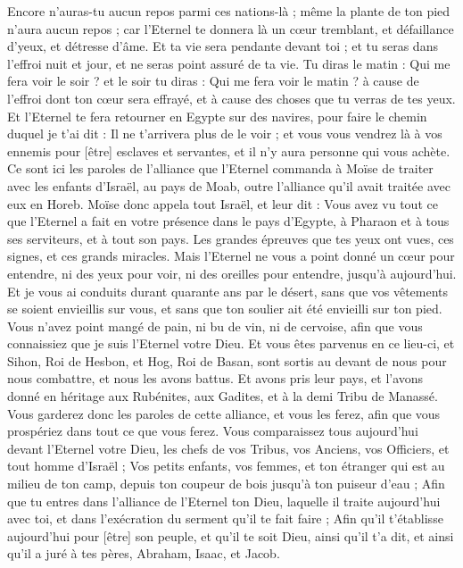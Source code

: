 \begin{multicols}{2}
Encore n'auras-tu aucun repos parmi ces nations-là ; même la plante de ton pied n'aura aucun repos ; car l'Eternel te donnera là un cœur tremblant, et défaillance d'yeux, et détresse d'âme.
Et ta vie sera pendante devant toi ; et tu seras dans l'effroi nuit et jour, et ne seras point assuré de ta vie.
Tu diras le matin : Qui me fera voir le soir ? et le soir tu diras : Qui me fera voir le matin ? à cause de l'effroi dont ton cœur sera effrayé, et à cause des choses que tu verras de tes yeux.
Et l'Eternel te fera retourner en Egypte sur des navires, pour faire le chemin duquel je t'ai dit : Il ne t'arrivera plus de le voir ; et vous vous vendrez là à vos ennemis pour [être] esclaves et servantes, et il n'y aura personne qui vous achète.
\VerseOne{}Ce sont ici les paroles de l'alliance que l'Eternel commanda à Moïse de traiter avec les enfants d'Israël, au pays de Moab, outre l'alliance qu'il avait traitée avec eux en Horeb.
Moïse donc appela tout Israël, et leur dit : Vous avez vu tout ce que l'Eternel a fait en votre présence dans le pays d'Egypte, à Pharaon et à tous ses serviteurs, et à tout son pays.
Les grandes épreuves que tes yeux ont vues, ces signes, et ces grands miracles.
Mais l'Eternel ne vous a point donné un cœur pour entendre, ni des yeux pour voir, ni des oreilles pour entendre, jusqu'à aujourd'hui.
Et je vous ai conduits durant quarante ans par le désert, sans que vos vêtements se soient envieillis sur vous, et sans que ton soulier ait été envieilli sur ton pied.
Vous n'avez point mangé de pain, ni bu de vin, ni de cervoise, afin que vous connaissiez que je suis l'Eternel votre Dieu.
Et vous êtes parvenus en ce lieu-ci, et Sihon, Roi de Hesbon, et Hog, Roi de Basan, sont sortis au devant de nous pour nous combattre, et nous les avons battus.
Et avons pris leur pays, et l'avons donné en héritage aux Rubénites, aux Gadites, et à la demi Tribu de Manassé.
Vous garderez donc les paroles de cette alliance, et vous les ferez, afin que vous prospériez dans tout ce que vous ferez.
Vous comparaissez tous aujourd'hui devant l'Eternel votre Dieu, les chefs de vos Tribus, vos Anciens, vos Officiers, et tout homme d'Israël ;
Vos petits enfants, vos femmes, et ton étranger qui est au milieu de ton camp, depuis ton coupeur de bois jusqu'à ton puiseur d'eau ;
Afin que tu entres dans l'alliance de l'Eternel ton Dieu, laquelle il traite aujourd'hui avec toi, et dans l'exécration du serment qu'il te fait faire ;
Afin qu'il t'établisse aujourd'hui pour [être] son peuple, et qu'il te soit Dieu, ainsi qu'il t'a dit, et ainsi qu'il a juré à tes pères, Abraham, Isaac, et Jacob.

\end{multicols}
